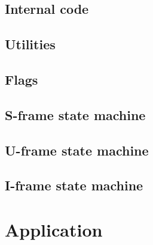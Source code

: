 \documentclass[a4paper, 11pt]{report}
\begin{document}
\subsection{Internal code}



\subsection{Utilities}



\begin{landscape}
\subsection{Flags}

\end{landscape}

\subsection{S-frame state machine}



\subsection{U-frame state machine}



\subsection{I-frame state machine}



\section{Application}


\end{document}
